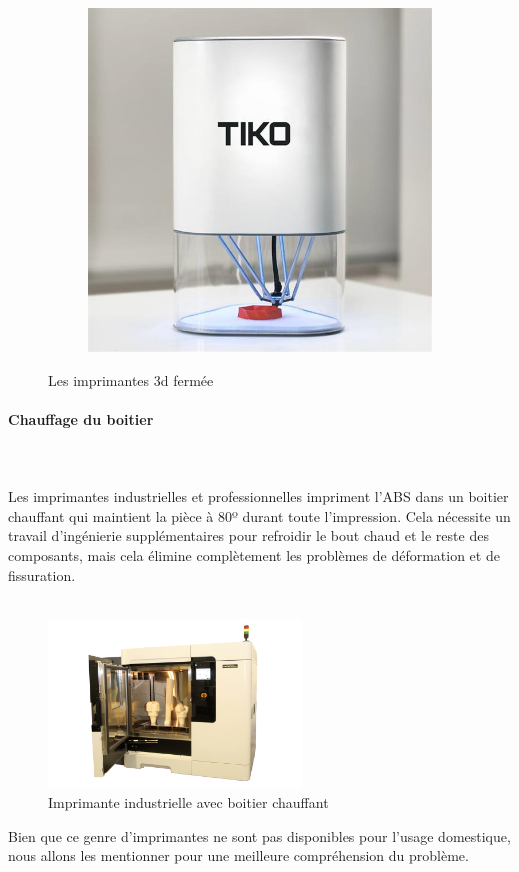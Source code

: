 \documentclass[11pt,a4paper]{article}
\begin{document}
\begin{figure}[H]
\begin{subfigure}[b]{0.3\textwidth}
        \includegraphics[width=\textwidth,cfbox=azul_marcos 4pt 0pt]{FOTOS/IMPRESORACERRADA3}
    \end{subfigure}
    \caption*{Les imprimantes 3d fermée}
\end{figure}
			\paragraph{Chauffage du boitier}\mbox{}\\\\
Les imprimantes industrielles et professionnelles impriment l’ABS dans un boitier chauffant qui maintient la pièce à 80º durant toute l'impression. Cela nécessite un travail d’ingénierie supplémentaires pour refroidir le bout chaud et le reste des composants, mais cela élimine complètement les problèmes de déformation et de fissuration.
\\\\
\begin{figure}[H]
\centering
\includegraphics[width=0.6\textwidth,cfbox=azul_marcos 4pt 0pt]{FOTOS/STRATASYS}
\caption*{Imprimante industrielle avec boitier chauffant}
\end{figure}
Bien que ce genre d’imprimantes ne sont pas disponibles pour l’usage domestique, nous allons les mentionner pour une meilleure compréhension du problème.
\end{document}

